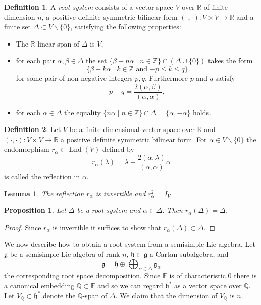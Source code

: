 \documentclass[12pt]{article}
\theoremstyle{plain}
\newtheorem{lemma}[thm]{Lemma}
\newtheorem{prop}[thm]{Proposition}
\theoremstyle{definition}
\newtheorem{defn}{Definition}[section]
\numberwithin{equation}{section}
\DeclareMathOperator{\en}{End}
\newcommand{\al}{\alpha}
\newcommand{\la}{\lambda}
\newcommand{\D}{\Delta}
\newcommand{\F}{\mathbb{F}}
\newcommand{\Q}{\mathbb{Q}}
\newcommand{\R}{\mathbb{R}}
\newcommand{\Z}{\mathbb{Z}}
\newcommand{\g}{\mathfrak{g}}
\newcommand{\h}{\mathfrak{h}}
\begin{document}
\begin{defn}
A \emph{root system} consists of a vector space $V$ over $\R$ of finite dimension $n$, a positive definite symmetric bilinear form $(\cdot, \cdot) : V \times V \rightarrow \R$ and a finite set $\D \subset V \backslash \{0\}$, satisfying the following properties:
\begin{itemize}
\item The $\R$-linear span of $\D$ is $V$,

\item for each pair $\al, \beta \in \D$ the set $\{\beta + n \al \mid n \in \Z\} \cap (\D \cup \{0\})$ takes the form
\[
\{\beta + k \al \mid \text{$k \in \Z$ and $-p \leq k \leq q$}\}
\]
for some pair of non negative integers $p, q$. Furthermore $p$ and $q$ satisfy
\[
p-q = \frac{2(\al, \beta)}{(\al, \al)},
\]

\item for each $\al \in \D$ the equality $\{n \al \mid n \in \Z\} \cap \D = \{\al, -\al\}$ holds.
\end{itemize}
\end{defn}

\begin{defn}
Let $V$ be a finite dimensional vector space over $\R$ and $(\cdot, \cdot) : V \times V \rightarrow \R$ a positive definite symmetric bilinear form. For $\al \in V \backslash \{0\}$ the endomorphism $r_\al \in \en(V)$ defined by
\[
r_\al(\la) = \la - \frac{2(\al, \la)}{(\al, \al)} \al
\]
is called the reflection in $\al$.
\end{defn}

\begin{lemma}
The reflection $r_\al$ is invertible and $r_\al^2 = I_V$.
\end{lemma}

\begin{prop}
Let $\D$ be a root system and $\al \in \D$. Then $r_\al(\D) = \D$.
\end{prop}

\begin{proof}
Since $r_\al$ is invertible it suffices to show that $r_\al(\D) \subset \D$.
\end{proof}



We now describe how to obtain a root system from a semisimple Lie algebra. Let $\g$ be a semisimple Lie algebra of rank $n$, $\h \subset \g$ a Cartan subalgebra, and
\[
\g = \h \oplus \bigoplus_{\al \in \D} \g_\al
\]
the corresponding root space decomposition. Since $\F$ is of characteristic $0$ there is a canonical embedding $\Q \subset \F$ and so we can regard $\h^*$ as a vector space over $\Q$. Let $V_\Q \subset \h^*$ denote the $\Q$-span of $\D$. We claim that the dimension of $V_\Q$ is $n$.
\end{document}
